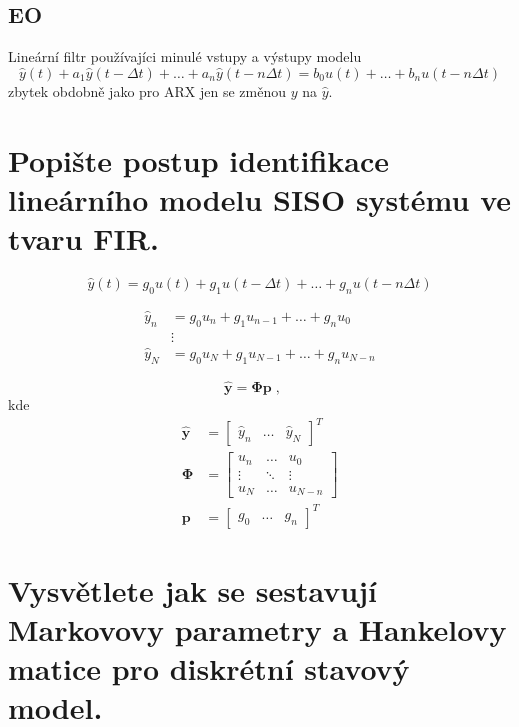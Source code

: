 \documentclass{article}
\begin{document}
	\subsection{EO}
	Lineární filtr používajíci minulé vstupy a výstupy modelu
	\begin{equation}
		\hat{y}(t) + a_1 \hat{y}(t-\Delta t) + \dots + a_n \hat{y}(t-n\Delta t)
		=
		b_0 u(t) + \dots + b_n u(t-n\Delta t)
	\end{equation}
	zbytek obdobně jako pro ARX jen se změnou $y$ na $\hat{y}$.


	\section{Popište postup identifikace lineárního modelu SISO systému ve tvaru FIR. }

	\begin{equation}
		\hat{y}(t) = g_0 u(t) + g_1 u(t-\Delta t) + \dots + g_n u(t-n\Delta t)
	\end{equation}

	\begin{align}
		\hat{y}_n &= g_0 u_n + g_1 u_{n-1} + \dots + g_n u_0 \\
		&\vdots \\
		\hat{y}_N &= g_0 u_{N} + g_1 u_{N-1} + \dots + g_n u_{N-n}
	\end{align}

	\begin{equation}
		\bm{\hat{y}} = \bm{\Phi} \bm{p}
		\;,\quad 
	\end{equation}
	kde
	\begin{align*}
		\bm{\hat{y}} &= \begin{bmatrix} \hat{y}_n & \dots & \hat{y}_N \end{bmatrix}^T
		\\ 
		\bm{\Phi}
		&=
		\begin{bmatrix}
			u_n & \dots & u_0 \\
			\vdots & \ddots & \vdots \\
			u_N & \dots & u_{N-n} 
		\end{bmatrix}
		\\ 
		\bm{p} &= \begin{bmatrix} g_0 & \dots & g_n \end{bmatrix}^T
	\end{align*}

	\section{Vysvětlete jak se sestavují Markovovy parametry a Hankelovy matice pro diskrétní stavový model. }
\end{document}
